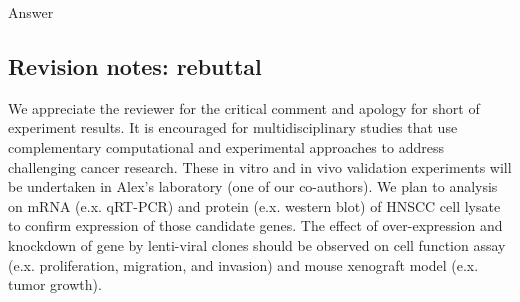 \documentclass[preprint,12pt]{elsarticle}
\newenvironment{MyColorPar}[1]{%
    \leavevmode\color{#1}\ignorespaces%
}{%
}%
\begin{document}
\begin{MyColorPar}{blue}
Answer


\subsection*{Revision notes: rebuttal}  
We appreciate the reviewer for the critical comment and apology for short of experiment results. 
It is encouraged for multidisciplinary studies that use complementary computational and  experimental approaches to address challenging cancer research.
These in vitro and in vivo validation experiments will be undertaken in Alex's laboratory (one of our co-authors).
We plan to analysis on mRNA (e.x. qRT-PCR) and protein (e.x. western blot) of HNSCC cell lysate to confirm expression of those candidate genes.
The effect of over-expression and knockdown of gene by lenti-viral clones should be observed on cell function assay (e.x. proliferation, migration, and invasion) and mouse xenograft model (e.x. tumor growth). %


\end{MyColorPar}
\end{document}
